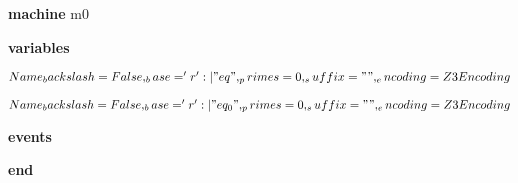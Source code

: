 \begin{block}
  \item   \textbf{machine} m0
  \item   \textbf{variables}
  \begin{block}
    \item   $Name {_backslash = False, _base = 'r' :| "eq", _primes = 0, _suffix = "", _encoding = Z3Encoding}$
    \item   $Name {_backslash = False, _base = 'r' :| "eq_0", _primes = 0, _suffix = "", _encoding = Z3Encoding}$
  \end{block}
  \item   
  \item   
  \item   \textbf{events}
  \begin{block}
    \item   
    \item   
  \end{block}
  \item   \textbf{end} \\
\end{block}
